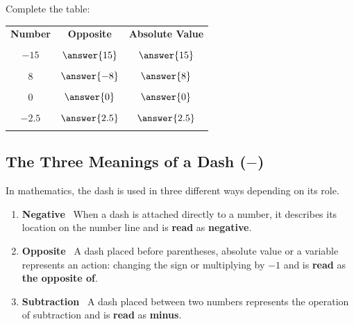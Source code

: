 \documentclass{ximera}[font=12pt]
\begin{document}
\begin{problem}

Complete the table:

\setlength{\arrayrulewidth}{1pt} %
\renewcommand{\arraystretch}{1.5} %
\begin{center}
\begin{tabular}{ccc}
\large{\textbf{Number}} & \large{\textbf{Opposite}} & \large{\textbf{Absolute Value}} \\
& & \\
$-15$ & $\answer{15}$ & $\answer{15}$ \\
& & \\
$8$ & $\answer{-8}$ & $\answer{8}$ \\
& & \\
$0$ & $\answer{0}$ & $\answer{0}$ \\
& & \\
$-2.5$ & $\answer{2.5}$ & $\answer{2.5}$ \\
& & \\
\end{tabular}
\end{center}

\end{problem}


\subsection*{The Three Meanings of a Dash ($-$)}

In mathematics, the dash is used in three different ways depending on its role.

\begin{enumerate}
    \item \textbf{Negative} \ When a dash is attached directly to a number, it describes its location on the number line and
    is \textbf{read} as \textbf{negative}.

    \item \textbf{Opposite} \ A dash placed before parentheses, absolute value or a variable represents an action: changing the sign or multiplying by 
    $-1$ and is \textbf{read} as \textbf{the opposite of}.

    \item \textbf{Subtraction} \ A dash placed between two numbers represents the operation of subtraction and is \textbf{read} as \textbf{minus}.
\end{enumerate}
\end{document}
